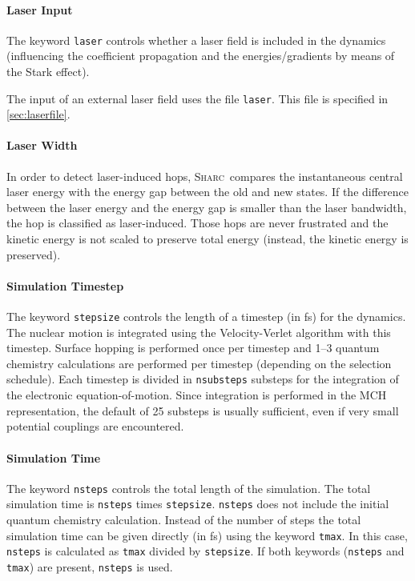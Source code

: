 \documentclass[a4paper,11pt,DIV=15,openany,twoside=false]{scrbook}
\newcommand{\sharc}{\textsc{Sharc}}
\newcommand{\ttt}[1]{\texttt{#1}}
\begin{document}
\paragraph{Laser Input}

The keyword \ttt{laser} controls whether a laser field is included in the dynamics (influencing the coefficient propagation and the energies/gradients by means of the Stark effect). 

The input of an external laser field uses the file \ttt{laser}. This file is specified in \ref{sec:laserfile}.

\paragraph{Laser Width}

In order to detect laser-induced hops, \sharc\ compares the instantaneous central laser energy with the energy gap between the old and new states. If the difference between the laser energy and the energy gap is smaller than the laser bandwidth, the hop is classified as laser-induced. Those hops are never frustrated and the kinetic energy is not scaled to preserve total energy (instead, the kinetic energy is preserved).

\paragraph{Simulation Timestep}

The keyword \ttt{stepsize} controls the length of a timestep (in fs) for the dynamics. The nuclear motion is integrated using the Velocity-Verlet algorithm with this timestep. Surface hopping is performed once per timestep and 1--3 quantum chemistry calculations are performed per timestep (depending on the selection schedule). Each timestep is divided in \ttt{nsubsteps} substeps for the integration of the electronic equation-of-motion. Since integration is performed in the MCH representation, the default of 25 substeps is usually sufficient, even if very small potential couplings are encountered.

\paragraph{Simulation Time}

The keyword \ttt{nsteps} controls the total length of the simulation. The total simulation time is \ttt{nsteps} times \ttt{stepsize}. \ttt{nsteps} does not include the initial quantum chemistry calculation. Instead of the number of steps the total simulation time can be given directly (in fs) using the keyword \ttt{tmax}. In this case, \ttt{nsteps} is calculated as \ttt{tmax} divided by \ttt{stepsize}. If both keywords (\ttt{nsteps} and \ttt{tmax}) are present, \ttt{nsteps} is used.
\end{document}
